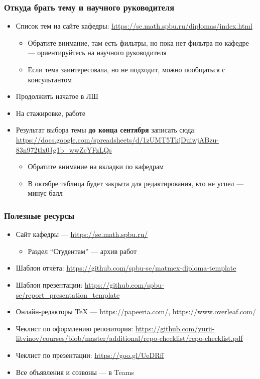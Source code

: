 \documentclass{../../slides-style}
\begin{document}
    \begin{frame}
        \frametitle{Откуда брать тему и научного руководителя}
        \begin{itemize}
            \item Список тем на сайте кафедры: \url{https://se.math.spbu.ru/diplomas/index.html}
            \begin{itemize}
                \item Обратите внимание, там есть фильтры, но пока нет фильтра по кафедре --- ориентируйтесь на научного руководителя
                \item Если тема заинтересовала, но не подходит, можно пообщаться с консультантом
            \end{itemize}
            \item Продолжить начатое в ЛШ
            \item На стажировке, работе
            \item Результат выбора темы \textbf{до конца сентября} записать сюда: \url{https://docs.google.com/spreadsheets/d/1zUMT5TkjDuiwjABzu-83n972tlx0Jg1b_wwZcYFzLQs}
            \begin{itemize}
                \item Обратите внимание на вкладки по кафедрам
                \item В октябре таблица будет закрыта для редактирования, кто не успел --- минус балл
            \end{itemize}
        \end{itemize}
    \end{frame}

    \begin{frame}
        \frametitle{Полезные ресурсы}
        \begin{itemize}
            \item Сайт кафедры --- \url{https://se.math.spbu.ru/}
            \begin{itemize}
                \item Раздел ``Студентам'' --- архив работ
            \end{itemize}
            \item Шаблон отчёта: \url{https://github.com/spbu-se/matmex-diploma-template}
            \item Шаблон презентации: \url{https://github.com/spbu-se/report_presentation_template}
            \item Онлайн-редакторы TeX --- \url{https://papeeria.com/}, \url{https://www.overleaf.com/}
            \item Чеклист по оформлению репозитория: \url{https://github.com/yurii-litvinov/courses/blob/master/additional/repo-checklist/repo-checklist.pdf}
            \item Чеклист по презентации: \url{https://goo.gl/UeDRff}
            \item Все объявления и созвоны --- в Teams
        \end{itemize}
    \end{frame}
\end{document}
